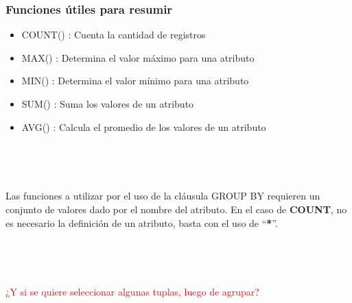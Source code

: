 \documentclass[
	10pt, %
	aspectratio=169, %
]{beamer}
\begin{document}

\begin{frame}[fragile]
	
	\frametitle{Funciones útiles para resumir}
	
	\begin{itemize}
		
		\item COUNT() : Cuenta la cantidad de registros
		
		\item MAX() : Determina el valor máximo para una atributo
		
		\item MIN() : Determina el valor mínimo para una atributo
		
		\item SUM() : Suma los valores de un atributo
		
		\item AVG() : Calcula el promedio de los valores de un atributo
		
	\end{itemize}
	
	\ 
	
	\ 
	
	\pause
	
	Las funciones a utilizar por el uso de la cláusula \textcolor{codepurple}{GROUP BY} requieren un conjunto de valores dado por el nombre del atributo. En el caso de \textbf{COUNT}, no es necesario la definición de un atributo, basta con el uso de ``\textbf{*}''.
	
	\ 
	
	\ 
	
	\pause
	
	\textcolor{red}{¿Y si se quiere seleccionar algunas tuplas, luego de agrupar?}
	
\end{frame}

\end{document}

